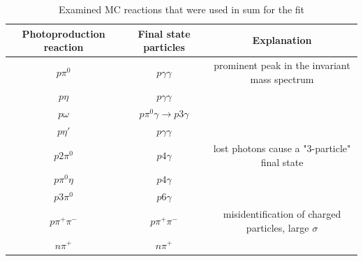 	\begin{table}[htbp]
		\begin{tabular}{ccc}
			\toprule
			Photoproduction reaction &Final state particles&Explanation\\
			\hline
			$p\pi^0$ & $p\gamma\gamma$&prominent peak in the invariant mass spectrum \\
			$p\eta$ & $p\gamma\gamma$& \\
			$p\omega$ & $p\pi^0\gamma\to p3\gamma$& \\
			$p\eta'$ & $p\gamma\gamma$&\\
			$p2\pi^0$ & $p4\gamma$&lost photons cause a "3-particle" final state\\
			$p\pi^0\eta$ & $p4\gamma$&\\
			$p3\pi^0$ & $p6\gamma$&\\
			$p\pi^+\pi^-$ &$p\pi^+\pi^-$&misidentification of charged particles, large $\sigma$\\
			$n\pi^+$ &$n\pi^+$&\\
			\bottomrule
		\end{tabular}
	\caption{Examined MC reactions that were used in sum for the fit}
	\label{tab:mc}
	\end{table}
	
